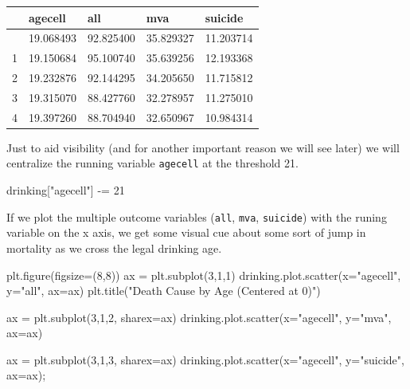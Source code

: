\documentclass[
  letterpaper,
  DIV=11,
  numbers=noendperiod]{scrreprt}
\newenvironment{Shaded}{\begin{snugshade}}{\end{snugshade}}
\newcommand{\DecValTok}[1]{\textcolor[rgb]{0.68,0.00,0.00}{#1}}
\newcommand{\NormalTok}[1]{\textcolor[rgb]{0.00,0.23,0.31}{#1}}
\newcommand{\OperatorTok}[1]{\textcolor[rgb]{0.37,0.37,0.37}{#1}}
\newcommand{\StringTok}[1]{\textcolor[rgb]{0.13,0.47,0.30}{#1}}
\begin{document}
\begin{longtable}[]{@{}lllll@{}}
\toprule\noalign{}
& agecell & all & mva & suicide \\
\midrule\noalign{}
\endhead
\bottomrule\noalign{}
\endlastfoot
0 & 19.068493 & 92.825400 & 35.829327 & 11.203714 \\
1 & 19.150684 & 95.100740 & 35.639256 & 12.193368 \\
2 & 19.232876 & 92.144295 & 34.205650 & 11.715812 \\
3 & 19.315070 & 88.427760 & 32.278957 & 11.275010 \\
4 & 19.397260 & 88.704940 & 32.650967 & 10.984314 \\
\end{longtable}

Just to aid visibility (and for another important reason we will see
later) we will centralize the running variable \texttt{agecell} at the
threshold 21.

\begin{Shaded}
\begin{Highlighting}[]
\NormalTok{drinking[}\StringTok{"agecell"}\NormalTok{] }\OperatorTok{{-}=} \DecValTok{21}
\end{Highlighting}
\end{Shaded}

If we plot the multiple outcome variables (\texttt{all}, \texttt{mva},
\texttt{suicide}) with the runing variable on the x axis, we get some
visual cue about some sort of jump in mortality as we cross the legal
drinking age.

\begin{Shaded}
\begin{Highlighting}[]
\NormalTok{plt.figure(figsize}\OperatorTok{=}\NormalTok{(}\DecValTok{8}\NormalTok{,}\DecValTok{8}\NormalTok{))}
\NormalTok{ax }\OperatorTok{=}\NormalTok{ plt.subplot(}\DecValTok{3}\NormalTok{,}\DecValTok{1}\NormalTok{,}\DecValTok{1}\NormalTok{)}
\NormalTok{drinking.plot.scatter(x}\OperatorTok{=}\StringTok{"agecell"}\NormalTok{, y}\OperatorTok{=}\StringTok{"all"}\NormalTok{, ax}\OperatorTok{=}\NormalTok{ax)}
\NormalTok{plt.title(}\StringTok{"Death Cause by Age (Centered at 0)"}\NormalTok{)}

\NormalTok{ax }\OperatorTok{=}\NormalTok{ plt.subplot(}\DecValTok{3}\NormalTok{,}\DecValTok{1}\NormalTok{,}\DecValTok{2}\NormalTok{, sharex}\OperatorTok{=}\NormalTok{ax)}
\NormalTok{drinking.plot.scatter(x}\OperatorTok{=}\StringTok{"agecell"}\NormalTok{, y}\OperatorTok{=}\StringTok{"mva"}\NormalTok{, ax}\OperatorTok{=}\NormalTok{ax)}

\NormalTok{ax }\OperatorTok{=}\NormalTok{ plt.subplot(}\DecValTok{3}\NormalTok{,}\DecValTok{1}\NormalTok{,}\DecValTok{3}\NormalTok{, sharex}\OperatorTok{=}\NormalTok{ax)}
\NormalTok{drinking.plot.scatter(x}\OperatorTok{=}\StringTok{"agecell"}\NormalTok{, y}\OperatorTok{=}\StringTok{"suicide"}\NormalTok{, ax}\OperatorTok{=}\NormalTok{ax)}\OperatorTok{;}
\end{Highlighting}
\end{Shaded}
\end{document}
